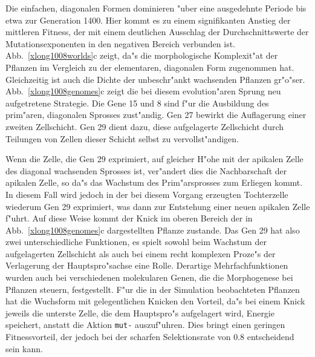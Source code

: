 Die einfachen, diagonalen Formen dominieren "uber eine ausgedehnte Periode bis etwa zur Generation 1400.
Hier kommt es zu einem signifikanten Anstieg der mittleren Fitness, der mit einem deutlichen Ausschlag
der Durchschnittswerte der Mutationsexponenten in den negativen Bereich verbunden ist.
Abb.\ \ref{xlong1008worlds}c zeigt, da"s die morphologische Komplexit"at der Pflanzen im Vergleich zu
der elementaren, diagonalen Form zugenommen hat. Gleichzeitig ist auch die Dichte der unbeschr"ankt
wachsenden Pflanzen gr"o"ser. Abb.\ \ref{xlong1008genomes}c zeigt die bei diesem evolution"aren Sprung
neu aufgetretene Strategie. Die Gene 15 und 8 sind f"ur die Ausbildung des prim"aren, diagonalen
Sprosses zust"andig. Gen 27 bewirkt die Auflagerung einer zweiten Zellschicht. Gen 29 dient dazu, diese
aufgelagerte Zellschicht durch Teilungen von Zellen dieser Schicht selbst zu vervollst"andigen.

Wenn die Zelle, die Gen 29 exprimiert, auf gleicher
H"ohe mit der apikalen Zelle des diagonal wachsenden Sprosses ist, ver"andert dies die Nachbarschaft
der apikalen Zelle, so da"s das Wachstum des Prim"arsprosses zum Erliegen kommt. In diesem Fall wird
jedoch in der bei diesem Vorgang erzeugten Tochterzelle wiederum Gen 29 exprimiert, was dann zur
Entstehung einer neuen apikalen Zelle f"uhrt. Auf diese Weise kommt der Knick im oberen Bereich
der in Abb.\ \ref{xlong1008genomes}c dargestellten Pflanze zustande. Das Gen 29 hat also zwei
unterschiedliche Funktionen, es spielt sowohl beim Wachstum der aufgelagerten Zellschicht als auch
bei einem recht komplexen Proze"s der Verlagerung der Hauptspro"sachse eine Rolle. Derartige
Mehrfachfunktionen wurden auch bei verschiedenen molekularen Genen, die die Morphogenese
bei Pflanzen steuern, festgestellt. F"ur die in der Simulation beobachteten Pflanzen hat die
Wuchsform mit gelegentlichen Knicken den Vorteil, da"s bei einem Knick jeweils die unterste Zelle,
die dem Hauptspro"s aufgelagert wird, Energie speichert, anstatt die Aktion \verb|mut-| auszuf"uhren.
Dies bringt einen geringen Fitnessvorteil, der jedoch bei der scharfen Selektionsrate von 0.8
entscheidend sein kann.

